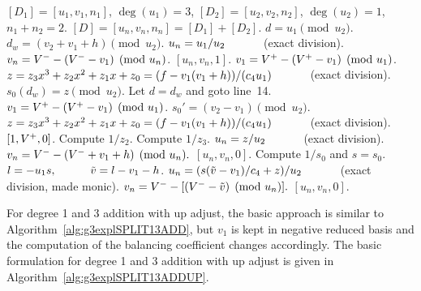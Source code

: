 \begin{algorithm}[H]
\caption{Genus 3 Split Model Degree 1 and 3 Addition\label{alg:g3explSPLIT13ADD}}
\begin{algorithmic} [1]
\Require $[D_1] = [u_1,v_1,n_1]$, $\deg(u_1) = 3$, $[D_2] = [u_2,v_2,n_2]$, $\deg(u_2) = 1$, $n_1 + n_2 = 2$.
\Ensure $[D] = [u_n,v_n,n_n] = [D_1] + [D_2] $.
\algrule
\vspace{-2pt}
\State $d = u_1 \pmod{u_2}$.
    \State $d_w = (v_2 + v_1 + h) \pmod{u_2}$.
        \State $u_n = u_1/u_2 \quad\quad\quad$ (exact division).
        \State $v_n = V^{-} - (V^{-} - v_1) \pmod{u_n}$.
        \State \Return $[u_n,v_n,1]$.
    \EndIf
    \State $v_1 = V^{+} - (V^{+} - v_1) \pmod{u_1}$.
    \State $z = z_3x^3 + z_2x^2 + z_1x + z_0 = (f - v_1(v_1 + h))/(c_4u_1) \quad\quad\quad$ (exact division).  
    \State $s_0(d_w) = z \pmod{u_2}$.
    \State Let $d = d_w$ and goto line~14.
\EndIf
\State $v_1 = V^{+} - (V^{+} - v_1) \pmod{u_1}$.
\State $s_0' = (v_2 - v_1) \pmod{u_2}$.
\State $z = z_3x^3 + z_2x^2 + z_1x + z_0 = (f - v_1(v_1 + h))/(c_4u_1) \quad\quad\quad$ (exact division).  
         \Return $[1,V^{+},0]$.
        \Else \hspace{3pt} Compute $1/z_2$.
        \EndIf
    \Else \hspace{3pt} Compute $1/z_3$.
    \EndIf
    \State $u_n = z/u_2 \quad\quad\quad$ (exact division).
    \State $v_n = V^{-} - (V^{-} + v_1 + h) \pmod{u_n}.$
    \State \Return $[u_n,v_n,0]$.
\EndIf
\State Compute $1/s_0$ and $s = s_0$.
\State $l = -u_1s, \quad\quad\quad \tilde{v} = l - v_1 - h$.
\State $u_n = (s(\tilde{v} - v_1)/c_4 + z)/u_2 \quad\quad\quad$ (exact division, made monic).
\State $v_n = V^{-} - [(V^{-} - \tilde{v}) \pmod{u_n}].$ 
\State \Return $[u_n,v_n,0]$.
\vspace{-2pt}
\end{algorithmic}
\end{algorithm}



For degree 1 and 3 addition with up adjust, the basic approach is similar to
Algorithm~\ref{alg:g3explSPLIT13ADD}, but $v_1$ is kept in negative reduced
basis and the computation of the balancing coefficient changes accordingly. The
basic formulation for degree 1 and 3 addition with up adjust is given in
Algorithm~\ref{alg:g3explSPLIT13ADDUP}.

